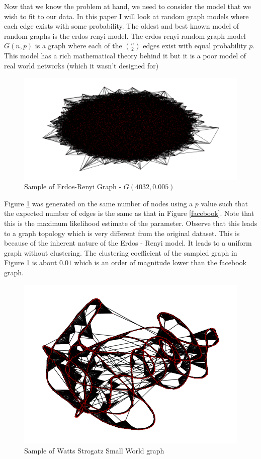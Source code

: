 \documentclass[dvips,12pt]{article}
\begin{document}
Now that we know the problem at hand, we need to consider the model that we wish to fit to our data. In this paper I will look at random graph models where each edge exists with some probability. The oldest and best known model of random graphs is the erdos-renyi model. The erdos-renyi random graph model $G(n,p)$ is a graph where each of the $n \choose 2$ edges exist with equal probability $p$. This model has a rich mathematical theory behind it but it is a poor model of real world networks (which it wasn't designed for)

\begin{figure}[!htb]
\centering
\includegraphics[scale=0.3]{Gnp_connectivity_graph}
\caption{Sample of Erdos-Renyi Graph - $G(4032,0.005)$}
\label{gnp}
\end{figure}

Figure \ref{gnp} was generated on the same number of nodes using a $p$ value such that the expected number of edges is the same as that in Figure \ref{facebook}. Note that this is the maximum likelihood estimate of the parameter. Observe that this leads to a graph topology which is very different from the original dataset. This is because of the inherent nature of the Erdos - Renyi model. It leads to a uniform graph without clustering. The clustering coefficient of the sampled graph in Figure \ref{gnp} is about $0.01$ which is an order of magnitude lower than the facebook graph.

\begin{figure}[!htb]
\centering
\includegraphics[scale=0.5]{watts_strogatz_connectivity_graph}
\caption{Sample of Watts Strogatz Small World graph}
\label{wssg}
\end{figure}
\end{document}
